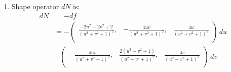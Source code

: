 \documentclass{article}
\newcommand\ifrac[2]{{\displaystyle\frac{#1}{#2}}}
\begin{document}
\begin{enumerate}[label=(\alph*)]
    \item
    Shape operator $dN$ is:
    \begin{align*}
        dN &= -df\\
            &=
            -\left(
            \begin{array}{ccc}
            \ifrac{-2 u^2+2 v^2+2}{\left(u^2+v^2+1\right)^2}, & -\ifrac{4 u v}{\left(u^2+v^2+1\right)^2}, & \ifrac{4 u}{\left(u^2+v^2+1\right)^2} \\
            \end{array}
            \right)\, du \\
            &-
            \left(
            \begin{array}{ccc}
            -\ifrac{4 u v}{\left(u^2+v^2+1\right)^2}, & \ifrac{2 \left(u^2-v^2+1\right)}{\left(u^2+v^2+1\right)^2}, & \ifrac{4 v}{\left(u^2+v^2+1\right)^2} \\
            \end{array}
            \right)\, dv
    \end{align*}
\end{enumerate}


\vspace{1.8cm}
\\\\
\end{document}
